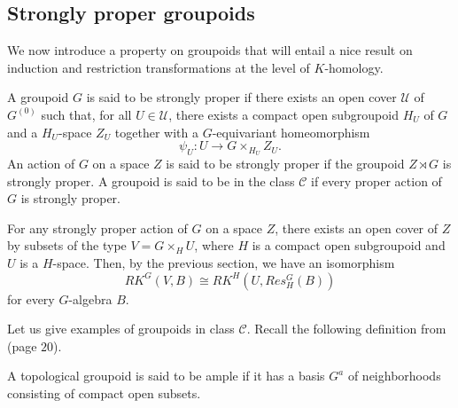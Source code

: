 \subsection{Strongly proper groupoids}

We now introduce a property on groupoids that will entail a nice result on induction and restriction transformations at the level of $K$-homology.

\begin{definition}\label{StronglyProper}
A groupoid $G$ is said to be strongly proper if there exists an open cover $\mathcal U$ of $G^{(0)}$ such that, for all $U\in\mathcal U$, there exists a compact open subgroupoid $H_U$ of $G$ and a $H_U$-space $Z_U$ together with a $G$-equivariant homeomorphism
\[\psi_U : U \rightarrow G\times_{H_U} Z_U.\] 
An action of $G$ on a space $Z$ is said to be strongly proper if the groupoid $Z\rtimes G$ is strongly proper. A groupoid is said to be in the class $\mathcal C$ if every proper action of $G$ is strongly proper.
\end{definition}

\begin{rk}
For any strongly proper action of $G$ on a space $Z$, there exists an open cover of $Z$ by subsets of the type $V=G\times_H U$, where $H$ is a compact open subgroupoid and $U$ is a $H$-space. Then, by the previous section, we have an isomorphism
\[RK^G(V,B)\cong RK^H(U, Res_H^G (B))\]
for every $G$-algebra $B$. 
\end{rk}

Let us give examples of groupoids in class $\mathcal C$. Recall the following definition from \cite{Renault} (page $20$).

\begin{definition}
A topological groupoid is said to be ample if it has a basis $G^a$ of neighborhoods consisting of compact open subsets.
\end{definition}

